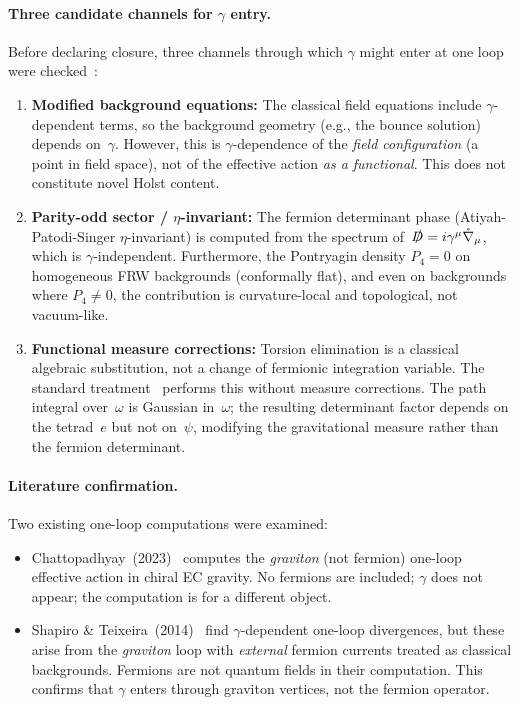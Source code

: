 \documentclass[11pt,letterpaper]{article}
\newcommand{\BI}{\gamma}               %
\begin{document}
\paragraph{Three candidate channels for $\BI$ entry.}
Before declaring closure, three channels through which $\BI$ might enter at
one loop were checked~\cite{branchG_analysis}:

\begin{enumerate}[label=(\alph*)]
  \item \textbf{Modified background equations:} The classical field equations
    include $\BI$-dependent terms, so the background geometry (e.g., the
    bounce solution) depends on~$\BI$. However, this is $\BI$-dependence of
    the \emph{field configuration} (a point in field space), not of the
    effective action \emph{as a functional}. This does not constitute novel
    Holst content.
  \item \textbf{Parity-odd sector / $\eta$-invariant:} The fermion determinant
    phase (Atiyah-Patodi-Singer $\eta$-invariant) is computed from the
    spectrum of~$\slashed{D}=i\gamma^\mu\mathring\nabla_\mu$, which is
    $\BI$-independent. Furthermore, the Pontryagin density $P_4=0$ on
    homogeneous FRW backgrounds (conformally flat), and even on backgrounds
    where $P_4\neq 0$, the contribution is curvature-local and topological,
    not vacuum-like.
  \item \textbf{Functional measure corrections:} Torsion elimination is a
    classical algebraic substitution, not a change of fermionic integration
    variable. The standard treatment~\cite{Freidel2005,Shapiro2002} performs
    this without measure corrections. The path integral over~$\omega$ is
    Gaussian in~$\omega$; the resulting determinant factor depends on the
    tetrad~$e$ but not on~$\psi$, modifying the gravitational measure rather
    than the fermion determinant.
\end{enumerate}

\paragraph{Literature confirmation.}
Two existing one-loop computations were examined:
\begin{itemize}
  \item Chattopadhyay~(2023)~\cite{Chattopadhyay2023} computes the
    \emph{graviton} (not fermion) one-loop effective action in chiral EC
    gravity. No fermions are included; $\BI$ does not appear; the computation
    is for a different object.
  \item Shapiro \& Teixeira~(2014)~\cite{ShapiroTeixeira2014} find
    $\BI$-dependent one-loop divergences, but these arise from the
    \emph{graviton} loop with \emph{external} fermion currents treated as
    classical backgrounds. Fermions are not quantum fields in their
    computation. This confirms that $\BI$ enters through graviton vertices,
    not the fermion operator.
\end{itemize}
\end{document}
